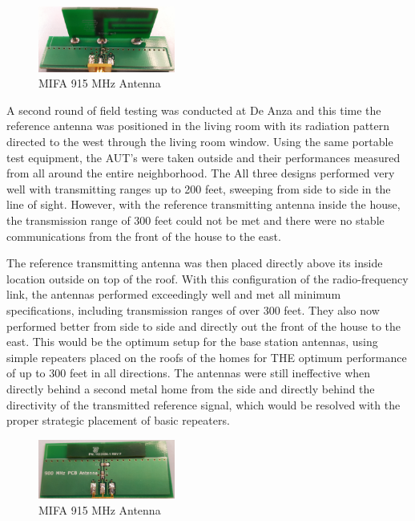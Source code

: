 \documentclass[journal,compsoc]{IEEEtran}
\begin{document}
\begin{figure}[ht]
\centering
\includegraphics[width=0.4\textwidth]{900MHzMIFAAntenna.jpg}
\caption{MIFA 915 MHz Antenna}
\label{900 MHz MIFA}
\end{figure}

A second round of field testing was conducted at De Anza and this time the reference antenna was positioned in the living room with its radiation pattern directed to the west through the living room window.  Using the same portable test equipment, the AUT’s were taken outside and their performances measured from all around the entire neighborhood.  The All three designs performed very well with transmitting ranges up to 200 feet, sweeping from side to side in the line of sight.  However, with the reference transmitting antenna inside the house, the transmission range of 300 feet could not be met and there were no stable communications from the front of the house to the east.

The reference transmitting antenna was then placed directly above its inside location outside on top of the roof.  With this configuration of the radio-frequency link, the antennas performed exceedingly well and met all minimum specifications, including transmission ranges of over 300 feet.  They also now performed better from side to side and directly out the front of the house to the east.  This would be the optimum setup for the base station antennas, using simple repeaters placed on the roofs of the homes for THE optimum performance of up to 300 feet in all directions.  The antennas were still ineffective when directly behind a second metal home from the side and directly behind the directivity of the transmitted reference signal, which would be resolved with the proper strategic placement of basic repeaters.

\begin{figure}[ht]
\centering
\includegraphics[width=0.4\textwidth]{900MHzRevFAntenna.jpg}
\caption{MIFA 915 MHz Antenna}
\label{900 MHz MIFA}
\end{figure}
\end{document}
